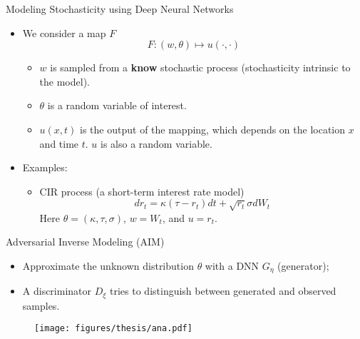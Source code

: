 \documentclass[usenames,dvipsnames]{beamer}
\begin{document}
\begin{frame}{Modeling Stochasticity using Deep Neural Networks}


\begin{itemize}
\item We consider a map $F$
$$F: (w, \theta) \mapsto u(\cdot, \cdot)$$
\begin{itemize}
\item $w$ is sampled from a \textbf{know} stochastic process (stochasticity intrinsic to the model).
\item $\theta$ is a random variable of interest. 
\item $u(x,t)$ is the output of the mapping, which depends on the location $x$ and time $t$. $u$ is also a random variable. 
 \end{itemize}
\item Examples:

\begin{itemize}
\item CIR process (a short-term interest rate model)
$$dr_t = \kappa(\tau-r_t)dt + \sqrt{r_t}\sigma dW_t$$
Here $\theta = (\kappa, \tau, \sigma)$, $w = W_t$, and $u = r_t$.
\end{itemize}
\end{itemize}

\end{frame}

\begin{frame}{Adversarial Inverse Modeling (AIM)}
	\begin{itemize}
\item Approximate the unknown distribution $\theta$ with a DNN $G_\eta$ (generator);
\item A discriminator $D_\xi$ tries to distinguish between generated and observed samples.
	\end{itemize}
	\begin{figure}[htbp]
	\centering
	\texttt{[image: figures/thesis/ana.pdf]}
\end{figure}
\end{frame}
\end{document}
